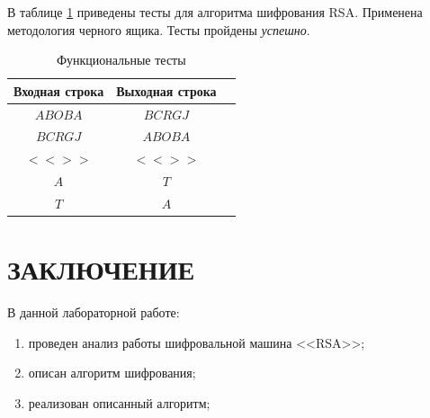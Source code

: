 В таблице \ref{tbl:functional_test} приведены тесты для алгоритма шифрования RSA. 
Применена методология черного ящика. Тесты пройдены \textit{успешно}.

\begin{table}[ht!]
	\begin{center}
		\captionsetup{justification=raggedright,singlelinecheck=off}
		\caption{\label{tbl:functional_test} Функциональные тесты}
		\begin{tabular}{|c|c|c|}
			\hline
			Входная строка & Выходная строка \\ 
			\hline
			$ABOBA$ & $BCRGJ$\\
			$BCRGJ$  & $ABOBA$\\
			$<<>>$  & $<<>>$ \\
            $A$ & $T$\\
			$T$  & $A$\\
			\hline
		\end{tabular}
	\end{center}
\end{table}

\clearpage
\section*{\large{ЗАКЛЮЧЕНИЕ}}
В данной лабораторной работе:
\begin{enumerate}
    \item проведен анализ работы шифровальной машина <<RSA>>;
    \item описан алгоритм шифрования;
    \item реализован описанный алгоритм;
\end{enumerate}